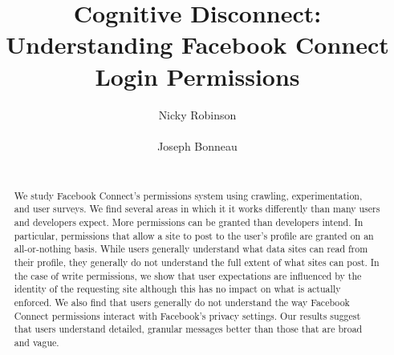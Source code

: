 \documentclass{sig-alternate}
\begin{document}
\sloppy



\title{Cognitive Disconnect:\\ Understanding Facebook Connect Login Permissions}

\author{
\alignauthor
Nicky Robinson\\
       \\
\alignauthor
Joseph Bonneau\\
       \\
}

\maketitle

\begin{abstract}
We study Facebook Connect's permissions system using crawling, experimentation, and user surveys.
We find several areas in which it it works differently than many users and developers expect.
More permissions can be granted than developers intend.
In particular, permissions that allow a site to post to the user's profile are granted on an all-or-nothing basis.
While users generally understand what data sites can read from their profile, they generally do not understand the full extent of what sites can post.
In the case of write permissions, we show that user expectations are influenced by the identity of the requesting site although this has no impact on what is actually enforced.
We also find that users generally do not understand the way Facebook Connect permissions interact with Facebook's privacy settings.
Our results suggest that users understand detailed, granular messages better than those that are broad and vague.


\end{abstract}
\end{document}
